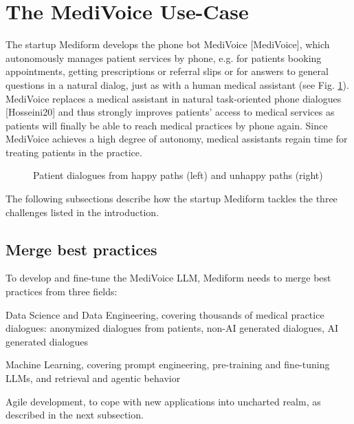 \documentclass[twocolumn]{article}
\begin{document}
\section{The MediVoice Use-Case}
The startup Mediform develops the phone bot MediVoice [MediVoice], which autonomously manages patient services by phone, e.g. for patients booking appointments, getting prescriptions or referral slips or for answers to general questions in a natural dialog, just as with a human medical assistant (see Fig. \ref{fig:dialogues}). MediVoice replaces a medical assistant in natural task-oriented phone dialogues  [Hosseini20] and thus strongly improves patients’ access to medical services as patients will finally be able to reach medical practices by phone again.
Since MediVoice achieves a high degree of autonomy, medical assistants regain time for treating patients in the practice. 

\begin{figure}[hbt!]
\begin{center}
\caption{Patient dialogues from happy paths (left) and unhappy paths (right)}
\label{fig:dialogues}
\end{center}
\end{figure}

The following subsections describe how the startup Mediform tackles the three challenges listed in the introduction. 

\subsection{Merge best practices}

To develop and fine-tune the MediVoice LLM, Mediform needs to merge best practices from three fields:
\begin{compactitem}
\item Data Science and Data Engineering, covering thousands of medical practice dialogues: anonymized dialogues from patients, non-AI generated dialogues, AI generated dialogues
\item Machine Learning, covering prompt engineering, pre-training and fine-tuning LLMs, and retrieval and agentic behavior
\item Agile development, to cope with new applications into uncharted realm, as described in the next subsection.
\end{compactitem}
\end{document}
